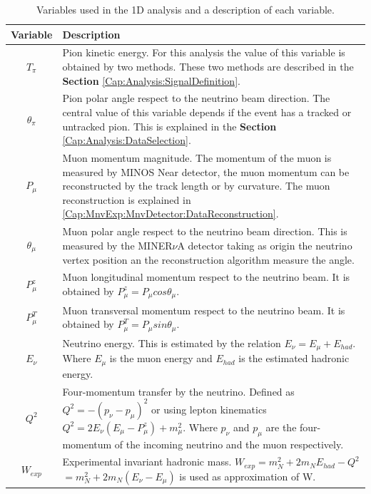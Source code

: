 \begin{table}[!htb]
    \centering
    \begin{tabular}{c|p{4.6in}}
        \hline
        Variable & Description \\ \hline
        $T_\pi$      & Pion kinetic energy. For this analysis the value of this variable is  obtained by two methods. These two methods are described in the \textbf{Section} \ref{Cap:Analysis:SignalDefinition}. \\ 
        \hline
        $\theta_\pi$ & Pion polar angle respect to the neutrino beam direction. The central value of this variable depends if the event has a tracked or untracked pion. This is explained in the \textbf{Section} \ref{Cap:Analysis:DataSelection}. \\
        \hline
        $P_\mu$      & Muon momentum magnitude. The momentum of the muon is measured by MINOS Near detector, the muon momentum can be reconstructed by the track length or by curvature. The muon reconstruction is explained in \ref{Cap:MnvExp:MnvDetector:DataReconstruction}. \\
        \hline
        $\theta_\mu$ & Muon polar angle respect to the neutrino beam direction. This is measured by the MINER$\nu$A detector taking as origin the neutrino vertex position an the reconstruction algorithm measure the angle.\\
        \hline
        $P^z_\mu$    & Muon longitudinal momentum respect to the neutrino beam. It is obtained by $P^z_\mu = P_\mu cos \theta_\mu$. \\
        \hline
        $P^T_\mu$    & Muon transversal momentum respect to the neutrino beam. It is obtained by $P^T_\mu = P_\mu sin \theta_\mu$. \\
        \hline
        $E_\nu$      & Neutrino energy. This is estimated by the relation $E_\nu = E_\mu + E_{had}$. Where $E_\mu$ is the muon energy and $E_{had}$ is the estimated hadronic energy. \\
        \hline
        $Q^2$        & Four-momentum transfer by the neutrino. Defined as $Q^2 = - (p_\nu -p_\mu)^2$ or using lepton kinematics $Q^2 = 2E_\nu(E_\mu-P^z_\mu) + m^2_\mu$. Where $p_\nu$ and $p_\mu$ are the four-momentum of the incoming neutrino and the muon respectively.\\ 
        \hline
        $W_{exp}$    & Experimental invariant hadronic mass. $W_{exp} = m^2_N + 2m_NE_{had} - Q^2$ $= m^2_N + 2m_N(E_\nu-E_\mu)$ is used as approximation of W.\\
        \hline
    \end{tabular}
    \caption{Variables used in the 1D analysis and a description of each variable.}
    \label{tab:Analisys:AnaVariables:1Danalysis}
\end{table}

